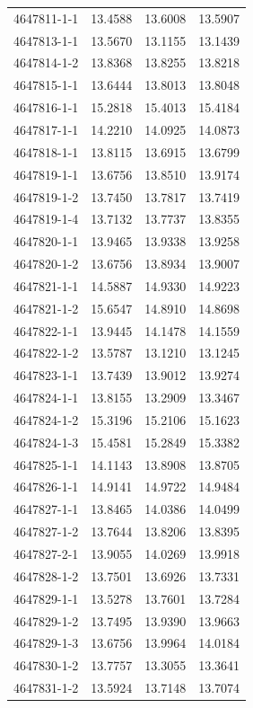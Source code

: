 \begin{longtable}{lrrr}
4647811-1-1 & 13.4588 & 13.6008 & 13.5907 \\
4647813-1-1 & 13.5670 & 13.1155 & 13.1439 \\
4647814-1-2 & 13.8368 & 13.8255 & 13.8218 \\
4647815-1-1 & 13.6444 & 13.8013 & 13.8048 \\
4647816-1-1 & 15.2818 & 15.4013 & 15.4184 \\
4647817-1-1 & 14.2210 & 14.0925 & 14.0873 \\
4647818-1-1 & 13.8115 & 13.6915 & 13.6799 \\
4647819-1-1 & 13.6756 & 13.8510 & 13.9174 \\
4647819-1-2 & 13.7450 & 13.7817 & 13.7419 \\
4647819-1-4 & 13.7132 & 13.7737 & 13.8355 \\
4647820-1-1 & 13.9465 & 13.9338 & 13.9258 \\
4647820-1-2 & 13.6756 & 13.8934 & 13.9007 \\
4647821-1-1 & 14.5887 & 14.9330 & 14.9223 \\
4647821-1-2 & 15.6547 & 14.8910 & 14.8698 \\
4647822-1-1 & 13.9445 & 14.1478 & 14.1559 \\
4647822-1-2 & 13.5787 & 13.1210 & 13.1245 \\
4647823-1-1 & 13.7439 & 13.9012 & 13.9274 \\
4647824-1-1 & 13.8155 & 13.2909 & 13.3467 \\
4647824-1-2 & 15.3196 & 15.2106 & 15.1623 \\
4647824-1-3 & 15.4581 & 15.2849 & 15.3382 \\
4647825-1-1 & 14.1143 & 13.8908 & 13.8705 \\
4647826-1-1 & 14.9141 & 14.9722 & 14.9484 \\
4647827-1-1 & 13.8465 & 14.0386 & 14.0499 \\
4647827-1-2 & 13.7644 & 13.8206 & 13.8395 \\
4647827-2-1 & 13.9055 & 14.0269 & 13.9918 \\
4647828-1-2 & 13.7501 & 13.6926 & 13.7331 \\
4647829-1-1 & 13.5278 & 13.7601 & 13.7284 \\
4647829-1-2 & 13.7495 & 13.9390 & 13.9663 \\
4647829-1-3 & 13.6756 & 13.9964 & 14.0184 \\
4647830-1-2 & 13.7757 & 13.3055 & 13.3641 \\
4647831-1-2 & 13.5924 & 13.7148 & 13.7074 \\

\end{longtable}
